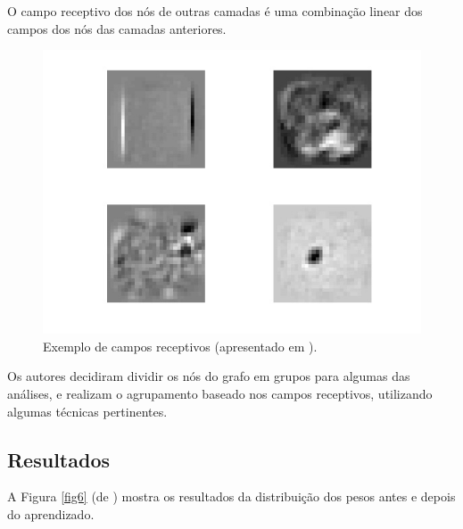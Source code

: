 \documentclass{article}
\begin{document}
            O campo receptivo dos nós de outras camadas é uma combinação linear dos campos dos nós das camadas anteriores.

            \begin{figure}[h!]
                \centering
                \includegraphics[scale=0.2]{Images/Receptive fields.png}
                \caption{Exemplo de campos receptivos (apresentado em \cite{testolin2018deep}).}
                \label{fig5}
            \end{figure}

            Os autores decidiram dividir os nós do grafo em grupos para algumas das análises, e realizam o agrupamento baseado nos campos receptivos, utilizando algumas técnicas pertinentes.

        \subsection{Resultados}

            A Figura \ref{fig6} (de \cite{testolin2018deep}) mostra os resultados da distribuição dos pesos antes e depois do aprendizado.
\end{document}
